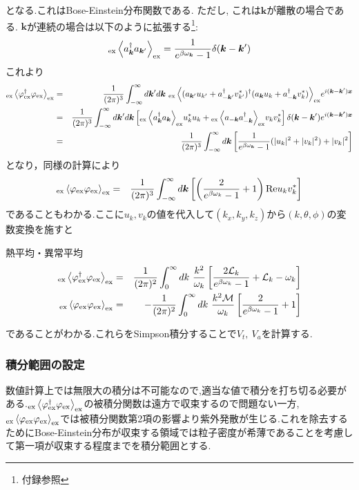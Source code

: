 \documentclass[10.5pt,a4paper]{jreport}
\newcommand{\Lk}{{\cal L}_k}
\newcommand{\M}{{\cal M}}
\begin{document}
となる.これはBose-Einstein分布関数である. ただし, これは$\bm{k}$が離散の場合である. $\bm{k}$が連続の場合は以下のように拡張する\footnote{付録参照}:
\begin{eqnarray}
  _{\rm ex}\ev{a_{\bm k}^\dagger a_{\bm{k}'}}_{\rm ex} = \frac{1}{e^{\beta\omega_{\bm{k}}}-1}\delta(\bm{k} - \bm{k}')
\end{eqnarray}
これより
\begin{eqnarray}
  \nonumber  _{\rm ex}\ev{\varphi^\dagger_{\rm ex}\varphi_{\rm ex}}_{\rm ex} &=& \frac{1}{(2\pi)^3}\int^{\infty}_{-\infty}  d \bm{k}' d \bm{k}\ {_{\rm ex}\ev{(a_{\bm{k}'}u_{k'}+a^\dagger_{-\bm{k}'}v^*_{k'})^\dagger(a_{\bm{k}}u_k+a^\dagger_{-\bm{k}}v^*_k)}_{\rm ex}}e^{i(\bm{k}-\bm{k}')\bm{x}}\\
  \nonumber  &=& \frac{1}{(2\pi)^3}\int^{\infty}_{-\infty} d \bm{k}' d \bm{k}\left[{_{\rm ex}\ev{a^\dagger_{\bm{k}}a_{\bm{k}}}_{\rm ex}}u^*_ku_k + {_{\rm ex}\ev{a_{-\bm{k}}a^\dagger_{-\bm{k}}}_{\rm ex}}v_kv^*_k\right]\delta(\bm{k}-\bm{k}')e^{i(\bm{k}-\bm{k'})\bm{x}}\\
  &=& \frac{1}{(2\pi)^3}\int^{\infty}_{-\infty} d\bm{k}\left[\frac{1}{e^{\beta\omega_{\bm{k}}}-1}(|u_k|^2+|v_k|^2)+|v_k|^2\right]
\end{eqnarray}
となり，同様の計算により
\begin{eqnarray}
  _{{\rm ex}}\ev{\varphi_{{\rm ex}}\varphi_{{\rm ex}}}_{{\rm ex}} &=& \frac{1}{(2\pi)^3}\int^\infty_{-\infty} d\bm{k}\left[\left(\frac{2}{e^{\beta\omega_k}-1}+1\right){\rm Re}u_kv^*_k\right]
\end{eqnarray}
であることもわかる.ここに$u_k,v_k$の値を代入して$(k_x, k_y, k_z)$から$(k, \theta, \phi)$の変数変換を施すと
\begin{itembox}[c]{熱平均・異常平均}
\begin{eqnarray}
  _{\rm ex}\ev{\varphi^\dagger_{\rm ex}\varphi_{\rm ex}}_{\rm ex} &=& \frac{1}{(2\pi)^2} \int^{\infty}_0 dk\ \frac{k^2}{\omega_k}\left[\frac{2\Lk}{e^{\beta\omega_k} - 1} + \Lk - \omega_k\right]\\
  _{\rm ex}\ev{\varphi_{\rm ex}\varphi_{\rm ex}}_{\rm ex} &=& -\frac{1}{(2\pi)^2} \int^{\infty}_0 dk\ \frac{k^2\M}{\omega_k}\left[\frac{2}{e^{\beta\omega_k}-1}+1\right]
\end{eqnarray}
\end{itembox}
であることがわかる.これらをSimpson積分することで$V_t,\ V_a$を計算する.
\subsubsection{積分範囲の設定}
数値計算上では無限大の積分は不可能なので,適当な値で積分を打ち切る必要がある.$_{\rm ex}\ev{\varphi^\dagger_{\rm ex}\varphi_{\rm ex}}_{\rm ex}$の被積分関数は遠方で収束するので問題ない一方,$_{\rm ex}\ev{\varphi_{\rm ex}\varphi_{\rm ex}}_{\rm ex}$では被積分関数第2項の影響より紫外発散が生じる.これを除去するためにBose-Einstein分布が収束する領域では粒子密度が希薄であることを考慮して第一項が収束する程度までを積分範囲とする.
\end{document}
